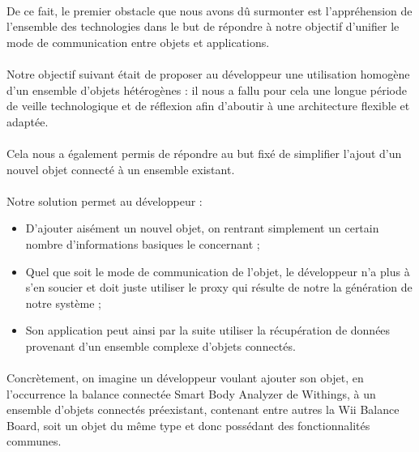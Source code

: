 \documentclass[nocopyrightspace]{sigplanconf}
\begin{document}
	\paragraph{}
	De ce fait, le premier obstacle que nous avons dû surmonter est l’appréhension de l’ensemble des technologies dans le but de répondre à notre objectif d’unifier le mode de communication entre objets et applications.

	\paragraph{}
	Notre objectif suivant était de proposer au développeur une utilisation homogène d’un ensemble d’objets hétérogènes : il nous a fallu pour cela une longue période de veille technologique et de réflexion afin d’aboutir à une architecture flexible et adaptée.

	\paragraph{}
	Cela nous a également permis de répondre au but fixé de simplifier l’ajout d’un nouvel objet connecté à un ensemble existant.

	\paragraph{}
	Notre solution permet au développeur :
	\begin{itemize}
		\item D’ajouter aisément un nouvel objet, on rentrant simplement un certain nombre d’informations basiques le concernant ;
		\item Quel que soit le mode de communication de l’objet, le développeur n’a plus à s’en soucier et doit juste utiliser le proxy qui résulte de notre la génération de notre système ;
		\item Son application peut ainsi par la suite utiliser la récupération de données provenant d’un ensemble complexe d’objets connectés.
	\end{itemize}

	\paragraph{}
	Concrètement, on imagine un développeur voulant ajouter son objet, en l’occurrence la balance connectée Smart Body Analyzer\cite{withings-smartbody} de Withings, à un ensemble d’objets connectés préexistant, contenant entre autres la Wii Balance Board, soit un objet du même type et donc possédant des fonctionnalités communes.
\end{document}
